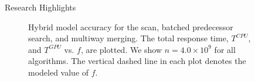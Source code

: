 \documentclass[final]{beamer}
\newlength{\sepwidth}
\newlength{\colwidth}
\newcommand{\separatorcolumn}{\begin{column}{\sepwidth}\end{column}}
\begin{document}
\begin{frame}[t]
\begin{columns}[t]
\begin{column}{\colwidth}
\begin{block}{Research Highlights}
\begin{figure}[htp]
\centering
{}

 \caption{Hybrid model accuracy for the scan, batched predecessor search, and multiway merging. The total response time, $T^{CPU}$, and $T^{GPU}$ vs. $f$, are plotted. We show $n=4.0\times10^9$ for all algorithms. The vertical dashed line in each plot denotes the modeled value of $f$.}

 \label{fig:time_vs_f}
\end{figure}

\end{block}

\end{column}

\separatorcolumn

\begin{column}{\colwidth}


\end{column}
\end{columns}
\end{frame}
\end{document}
